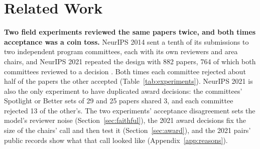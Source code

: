 \documentclass{article}
\begin{document}
\clearpage

\small


\clearpage
\normalsize
\appendix
\section{Related Work}\label{app:related}

\textbf{Two field experiments reviewed the same papers twice, and both times acceptance was a coin toss.} NeurIPS 2014 sent a tenth of its submissions to two independent program committees, each with its own reviewers and area chairs, and NeurIPS 2021 repeated the design with 882 papers, 764 of which both committees reviewed to a decision \citep{lawrence2014nips,cortes2021inconsistency,beygelzimer2023neurips}. Both times each committee rejected about half of the papers the other accepted (Table~\ref{tab:experiments}). NeurIPS 2021 is also the only experiment to have duplicated award decisions: the committees' Spotlight or Better sets of 29 and 25 papers shared 3, and each committee rejected 13 of the other's. The two experiments' acceptance disagreement sets the model's reviewer noise (Section~\ref{sec:faithful}), the 2021 award decisions fix the size of the chairs' call and then test it (Section~\ref{sec:award}), and the 2021 pairs' public records show what that call looked like (Appendix~\ref{app:reasons}).
\end{document}

